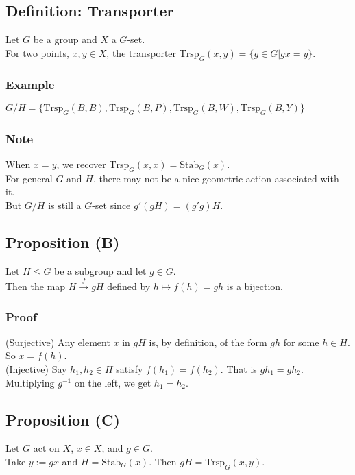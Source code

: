 \documentclass[11pt]{article}
\newcommand{\0}{\emptyset}
\begin{document}
\subsection*{Definition: Transporter}
\label{sec:org26c8ef0}
Let \(G\) be a group and \(X\) a \(G\)-set.\\[0pt]
For two points, \(x,y\in X\), the transporter \(\text{Trsp}_{G}(x,y)=\{g\in G|gx=y\}\).\\[0pt]
\subsubsection*{Example}
\label{sec:orga85af68}
\(G/H=\{\text{Trsp}_{G}(B,B),\text{Trsp}_{G}(B,P),\text{Trsp}_{G}(B,W),\text{Trsp}_{G}(B,Y)\}\)\\[0pt]
\subsubsection*{Note}
\label{sec:org2291e64}
When \(x=y\), we recover \(\text{Trsp}_{G}(x,x)=\text{Stab}_{G}(x)\).\\[0pt]
For general \(G\) and \(H\), there may not be a nice geometric action associated with it.\\[0pt]
But \(G/H\) is still a \(G\)-set since \(g'(gH)=(g'g)H\).\\[0pt]
\subsection*{Proposition (B)}
\label{sec:orgd00a9e2}
Let \(H\leq G\) be a subgroup and let \(g\in G\).\\[0pt]
Then the map \(H\overset{f}{\to}gH\) defined by \(h\mapsto f(h)=gh\) is a bijection.\\[0pt]
\subsubsection*{Proof}
\label{sec:org7e3c0f7}
(Surjective) Any element \(x\) in \(gH\) is, by definition, of the form \(gh\) for some \(h\in H\). So \(x=f(h)\).\\[0pt]
(Injective) Say \(h_{1},h_{2}\in H\) satisfy \(f(h_{1})=f(h_{2})\). That is \(gh_{1}=gh_{2}\). Multiplying \(g^{-1}\) on the left, we get \(h_{1}=h_{2}\).\\[0pt]
\subsection*{Proposition (C)}
\label{sec:org0361b7e}
Let \(G\) act on \(X\), \(x\in X\), and \(g\in G\).\\[0pt]
Take \(y:=gx\) and \(H=\text{Stab}_{G}(x)\). Then \(gH=\text{Trsp}_{G}(x,y)\).\\[0pt]
\end{document}
